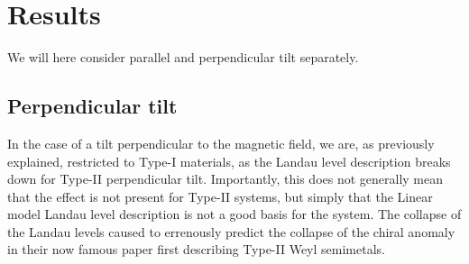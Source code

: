 \section{Results}
We will here consider parallel and perpendicular tilt separately.

\subsection{Perpendicular tilt}
In the case of a tilt perpendicular to the magnetic field, we are, as previously explained, restricted to Type-I materials, as the Landau level description breaks down for Type-II perpendicular tilt.
Importantly, this does not generally mean that the effect is not present for Type-II systems, but simply that the Linear model Landau level description is not a good basis for the system.
The collapse of the Landau levels caused \textcite{soluyanovTypeIIWeylSemimetals2015} to errenously predict the collapse of the chiral anomaly in their now famous paper first describing Type-II Weyl semimetals.

